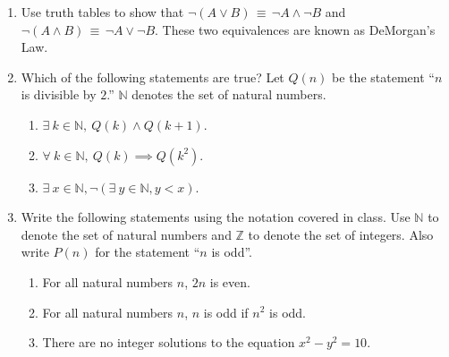 \documentclass[11pt]{article}
\begin{document}
\maketitle

\begin{enumerate}

\item Use truth tables to show that $\neg (A\vee B) \,\equiv\, \neg A
\wedge \neg B$ and $\neg (A\wedge B) \,\equiv\, \neg A \vee \neg
B$. These two equivalences are known as DeMorgan's Law.


\item Which of the following statements are true? Let $Q(n)$
  be the statement ``$n$ is divisible by $2$.''  $\mathbb{N}$ denotes the
  set of natural numbers.
  \begin{enumerate}
    \item $\exists \ k\in \mathbb{N}, \ Q(k) \wedge Q(k+1)$.
    \item $\forall \ k\in \mathbb{N}, \ Q(k)\implies Q(k^2)$.
    \item $\exists \ x\in \mathbb{N}, \neg(\exists \ y\in \mathbb{N}, y < x)$.
  \end{enumerate}


\item Write the following statements using the notation covered in class. Use $\mathbb{N}$ to denote the set of natural numbers and $\mathbb{Z}$ to denote the
set of integers.  Also write $P(n)$ for the statement ``$n$ is odd''.
\begin{enumerate}
\item For all natural numbers $n$, $2n$ is even.
\item For all natural numbers $n$, $n$ is odd if $n^2$ is odd.
\item There are no integer solutions to the equation $x^2 - y^2 = 10$.
\end{enumerate}




\end{enumerate}
\end{document}
